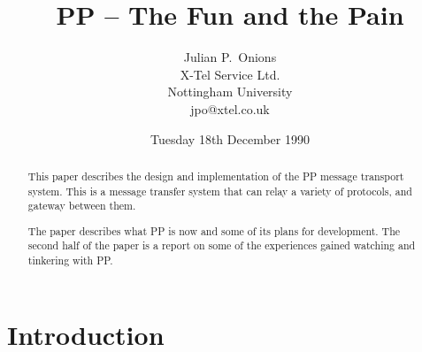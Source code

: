 





\title{PP -- The Fun and the Pain}
\author{Julian P.~Onions\\[0.1in]
X-Tel Service Ltd.\\
Nottingham University\\[0.1in]
jpo@xtel.co.uk}
\date{Tuesday 18th December 1990}

\maketitle

\begin{abstract}
This paper describes the design and implementation of
the PP message transport system. This is a message transfer system
that can relay a variety of protocols, and gateway between them.

The paper describes what PP is now and some of its plans for
development. The second half of the paper is a report on some of the
experiences gained watching and tinkering with PP.
\end{abstract}

\section{Introduction}

